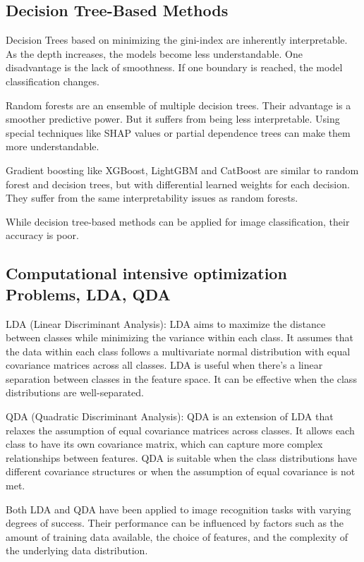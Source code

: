 \subsection{Decision Tree-Based Methods}

Decision Trees based on minimizing the gini-index are inherently interpretable. As the depth increases, the models become less understandable. One disadvantage is the lack of smoothness. If one boundary is reached, the model classification changes.

Random forests are an ensemble of multiple decision trees. Their advantage is a smoother predictive power. But it suffers from being less interpretable. Using special techniques like SHAP values \cite{lundberg2017unified} or partial dependence trees can make them more understandable.

Gradient boosting like XGBoost, LightGBM and CatBoost are similar to random forest and decision trees, but with differential learned weights for each decision. They suffer from the same interpretability issues as random  forests.

While decision tree-based methods can be applied for image classification, their accuracy is poor.

\subsection{Computational intensive optimization Problems, LDA, QDA}

LDA (Linear Discriminant Analysis):
LDA aims to maximize the distance between classes while minimizing the variance within each class.
It assumes that the data within each class follows a multivariate normal distribution with equal covariance matrices across all classes.
LDA is useful when there's a linear separation between classes in the feature space.
It can be effective when the class distributions are well-separated.

QDA (Quadratic Discriminant Analysis):
QDA is an extension of LDA that relaxes the assumption of equal covariance matrices across classes.
It allows each class to have its own covariance matrix, which can capture more complex relationships between features.
QDA is suitable when the class distributions have different covariance structures or when the assumption of equal covariance is not met.

Both LDA and QDA have been applied to image recognition tasks with varying degrees of success. Their performance can be influenced by factors such as the amount of training data available, the choice of features, and the complexity of the underlying data distribution.

